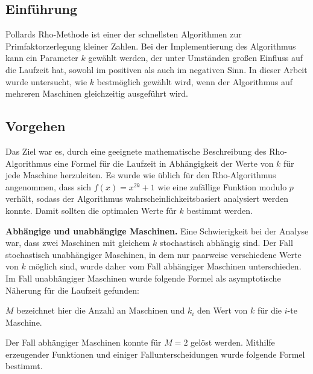 \documentclass[a4paper, extrafontsizes, ngerman, 25pt]{memoir}
\begin{document}
\subsection{Einführung}

Pollards Rho-Methode ist einer der schnellsten Algorithmen zur Primfaktorzerlegung kleiner Zahlen. Bei der Implementierung des Algorithmus kann ein Parameter $k$ gewählt werden, der unter Umständen großen Einfluss auf die Laufzeit hat, sowohl im positiven als auch im negativen Sinn. In dieser Arbeit wurde untersucht, wie $k$ bestmöglich gewählt wird, wenn der Algorithmus auf mehreren Maschinen gleichzeitig ausgeführt wird.

\newpage

\subsection{Vorgehen}

Das Ziel war es, durch eine geeignete mathematische Beschreibung des Rho-Algorithmus eine Formel für die Laufzeit in Abhängigkeit der Werte von $k$ für jede Maschine herzuleiten. Es wurde wie üblich für den Rho-Algorithmus angenommen, dass sich $f(x) = x^{2k} + 1$ wie eine zufällige Funktion modulo $p$ verhält, sodass der Algorithmus wahrscheinlichkeitsbasiert analysiert werden konnte. Damit sollten die optimalen Werte für $k$ bestimmt werden.

\vspace{0.5cm}
\noindent \textbf{Abhängige und unabhängige Maschinen.} Eine Schwierigkeit bei der Analyse war, dass zwei Maschinen mit gleichem $k$ stochastisch abhängig sind. Der Fall stochastisch unabhängiger Maschinen, in dem nur paarweise verschiedene Werte von $k$ möglich sind, wurde daher vom Fall abhängiger Maschinen unterschieden. Im Fall unabhängiger Maschinen wurde folgende Formel als asymptotische Näherung für die Laufzeit gefunden:

\begin{figure}[H]
    \hspace{3.3cm} 
\end{figure}

\noindent $M$ bezeichnet hier die Anzahl an Maschinen und $k_i$ den Wert von $k$ für die $i$-te Maschine.

Der Fall abhängiger Maschinen konnte für $M = 2$ gelöst werden. Mithilfe erzeugender Funktionen und einiger Fallunterscheidungen wurde folgende Formel bestimmt.

\begin{figure}[H]
    \hspace{3.7cm}
    
\end{figure}
\end{document}
